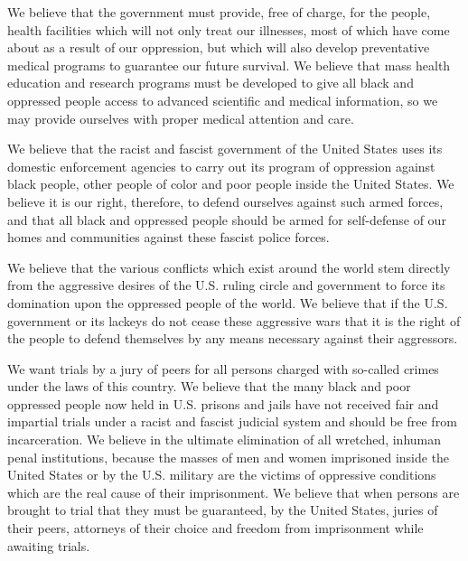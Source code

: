 \documentclass[14pt]{extarticle}
\begin{document}
 We believe that the government must provide, free of charge, for the people, health facilities which will not only treat our illnesses, most of which have come about as a result of our oppression, but which will also develop preventative medical programs to guarantee our future survival. We believe that mass health education and research programs must be developed to give all black and oppressed people access to advanced scientific and medical information, so we may provide ourselves with proper medical attention and care.

 We believe that the racist and fascist government of the United States uses its domestic enforcement agencies to carry out its program of oppression against black people, other people of color and poor people inside the United States. We believe it is our right, therefore, to defend ourselves against such armed forces, and that all black and oppressed people should be armed for self-defense of our homes and communities against these fascist police forces.

 We believe that the various conflicts which exist around the world stem directly from the aggressive desires of the U.S. ruling circle and government to force its domination upon the oppressed people of the world. We believe that if the U.S. government or its lackeys do not cease these aggressive wars that it is the right of the people to defend themselves by any means necessary against their aggressors.

 We want trials by a jury of peers for all persons charged with so-called crimes under the laws of this country. We believe that the many black and poor oppressed people now held in U.S. prisons and jails have not received fair and impartial trials under a racist and fascist judicial system and should be free from incarceration. We believe in the ultimate elimination of all wretched, inhuman penal institutions, because the masses of men and women imprisoned inside the United States or by the U.S. military are the victims of oppressive conditions which are the real cause of their imprisonment. We believe that when persons are brought to trial that they must be guaranteed, by the United States, juries of their peers, attorneys of their choice and freedom from imprisonment while awaiting trials.
\end{document}
